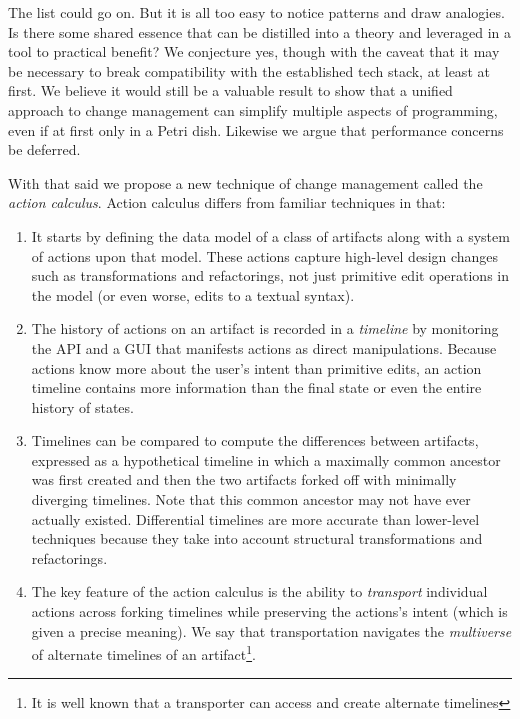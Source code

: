 \documentclass[english,submission]{programming}
\theoremstyle{definition}
\begin{document}
\medskip
The list could go on. But it is all too easy to notice patterns and draw analogies. Is there some shared essence that can be distilled into a theory and leveraged in a tool to practical benefit? We conjecture yes, though with the caveat that it may be necessary to break compatibility with the established tech stack, at least at first. We believe it would still be a valuable result to show that a unified approach to change management can  simplify multiple aspects of programming, even if at first only in a Petri dish.
Likewise we argue that performance concerns be deferred.

With that said we propose a new technique of change management called the \textit{action calculus}. Action calculus differs from familiar techniques in that:
\begin{enumerate}

  \item It starts by defining the data model of a class of artifacts along with a system of actions upon that model. These actions capture high-level design changes such as transformations and refactorings, not just primitive edit operations in the model (or even worse, edits to a textual syntax).

  \item The history of actions on an artifact is recorded in a \textit{timeline} by monitoring the API and a GUI that manifests actions as direct manipulations.
  Because actions know more about the user's intent than primitive edits, an action timeline contains more information than the final state or even the entire history of states.

  \item Timelines can be compared to compute the differences between artifacts, expressed as a hypothetical timeline in which a maximally common ancestor was first created and then the two artifacts forked off with minimally diverging timelines. Note that this common ancestor may not have ever actually existed.
  Differential timelines are more accurate than lower-level techniques because they take into account structural transformations and refactorings.

  \item The key feature of the action calculus is the ability to \textit{transport} individual actions across forking timelines while preserving the actions's intent (which is given a precise meaning).
  We say that transportation navigates the \textit{multiverse} of alternate timelines of an artifact\footnote{It is well known that a transporter can access and create alternate timelines\cite{mirrormirror}}.


\end{enumerate}
\end{document}
